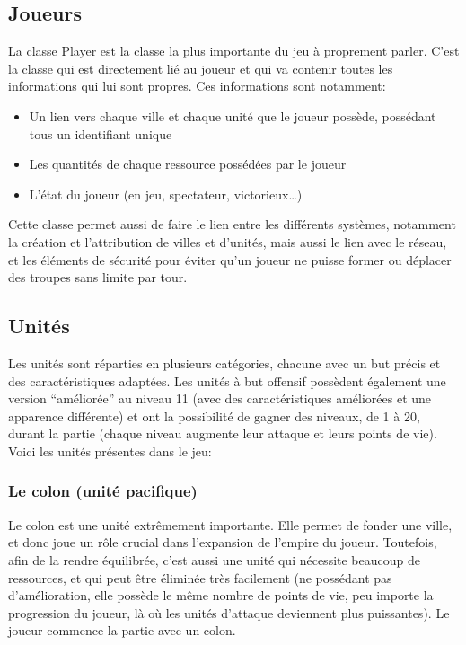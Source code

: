 \documentclass[12pt]{report}
\begin{document}
\subsection{Joueurs}

La classe Player est la classe la plus importante du jeu à proprement parler.
C’est la classe qui est directement lié au joueur et qui va contenir toutes les
informations qui lui sont propres. Ces informations sont notamment:

\begin{itemize}
    \item Un lien vers chaque ville et chaque unité que le joueur possède,
        possédant tous un identifiant unique
    \item Les quantités de chaque ressource possédées par le joueur
    \item L’état du joueur (en jeu, spectateur, victorieux…)
\end{itemize}

Cette classe permet aussi de faire le lien entre les différents systèmes,
notamment la création et l’attribution de villes et d’unités, mais aussi le lien
avec le réseau, et les éléments de sécurité pour éviter qu’un joueur ne puisse
former ou déplacer des troupes sans limite par tour.

\subsection{Unités}

Les unités sont réparties en plusieurs catégories, chacune avec un but précis et
des caractéristiques adaptées. Les unités à but offensif possèdent également une
version “améliorée” au niveau 11 (avec des caractéristiques améliorées et une
apparence différente) et ont la possibilité de gagner des niveaux, de 1 à 20,
durant la partie (chaque niveau augmente leur attaque et leurs points de vie).
Voici les unités présentes dans le jeu:

\subsubsection{Le colon (unité pacifique)}

Le colon est une unité extrêmement importante. Elle permet de fonder une ville,
et donc joue un rôle crucial dans l’expansion de l’empire du joueur. Toutefois,
afin de la rendre équilibrée, c’est aussi une unité qui nécessite beaucoup de
ressources, et qui peut être éliminée très facilement (ne possédant pas
d’amélioration, elle possède le même nombre de points de vie, peu importe la
progression du joueur, là où les unités d’attaque deviennent plus puissantes).
Le joueur commence la partie avec un colon.
\end{document}
